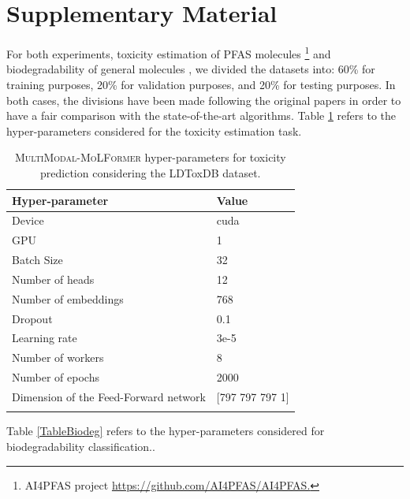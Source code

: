 \section*{Supplementary Material}
For both experiments, toxicity estimation of PFAS molecules \cite{feinstein2021uncertainty} \footnote{AI4PFAS project \url{ https://github.com/AI4PFAS/AI4PFAS.}} and biodegradability of general molecules \cite{lee2022comparative}, we divided the datasets into: 60\% for training purposes, 20\% for validation purposes, and 20\% for testing purposes. In both cases, the divisions have been made following the original papers in order to have a fair comparison with the state-of-the-art algorithms.
Table \ref{TableTox} refers to the hyper-parameters considered for the toxicity estimation task. 

\begin{table}[htbp]
\scriptsize
\centering
\caption{\textsc{MultiModal}-\textsc{MoLFormer} hyper-parameters for toxicity prediction considering the LDToxDB dataset.}

\label{TableTox}
\begin{tabular}{@{}p{4cm}p{2cm}}
\toprule
\textbf{Hyper-parameter} & \textbf{Value}  \\ \midrule

Device & cuda  \\
GPU & 1 \\
Batch Size & 32  \\
Number of heads & 12  \\
Number of embeddings & 768  \\
Dropout & 0.1  \\
Learning rate & 3e-5\\
Number of workers & 8\\
Number of epochs & 2000\\
Dimension of the Feed-Forward network & [797 797 797 1] \\
 
 \\\bottomrule
\end{tabular}
\end{table}

Table \ref{TableBiodeg} refers to the hyper-parameters considered for biodegradability classification.. 


